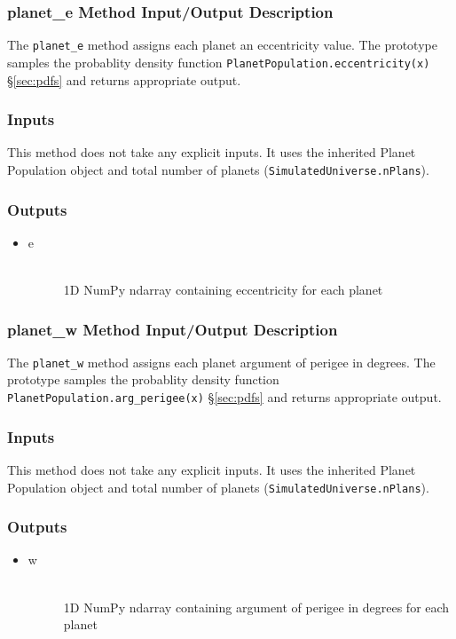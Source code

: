 \documentclass[cleanfoot]{asme2ej}
\begin{document}
\subsubsection{planet\_e Method Input/Output Description} \label{sec:planetetask}
The \verb+planet_e+ method assigns each planet an eccentricity value. The prototype samples the probablity density function \verb+PlanetPopulation.eccentricity(x)+ \S\ref{sec:pdfs} and returns appropriate output.

\subsubsection*{Inputs}
This method does not take any explicit inputs.  It uses the inherited Planet Population object and total number of planets (\verb+SimulatedUniverse.nPlans+).

\subsubsection*{Outputs}
\begin{itemize}
    \item 
    \begin{description}
        \item[e] \hfill \\
        1D NumPy ndarray containing eccentricity for each planet
    \end{description}
\end{itemize}

\subsubsection{planet\_w Method Input/Output Description} \label{sec:planetwtask}
The \verb+planet_w+ method assigns each planet argument of perigee in degrees. The prototype samples the probablity density function \verb+PlanetPopulation.arg_perigee(x)+ \S\ref{sec:pdfs} and returns appropriate output.

\subsubsection*{Inputs}
This method does not take any explicit inputs.  It uses the inherited Planet Population object and total number of planets (\verb+SimulatedUniverse.nPlans+).

\subsubsection*{Outputs}
\begin{itemize}
    \item 
    \begin{description}
        \item[w] \hfill \\
        1D NumPy ndarray containing argument of perigee in degrees for each planet
    \end{description}
\end{itemize}
\end{document}
